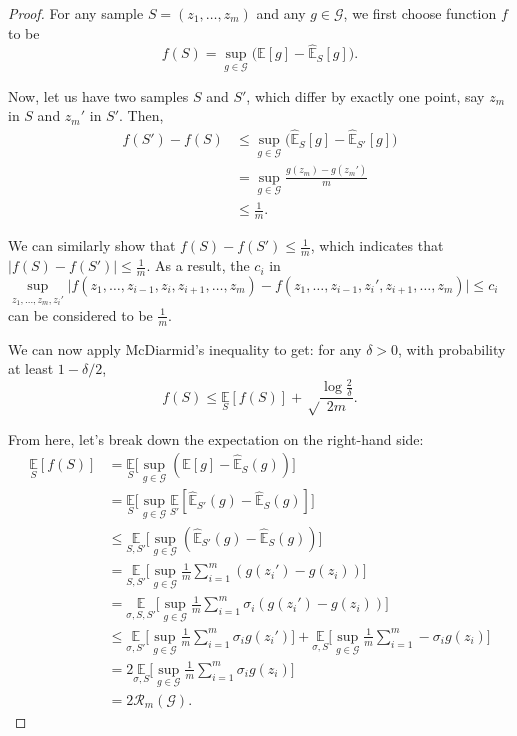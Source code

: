 \documentclass[twoside]{article}
\theoremstyle{definition}
\theoremstyle{definition}
\theoremstyle{remark}
\begin{document}
\begin{proof}

For any sample $S = (z_1,\ldots,z_m)$ and any $g\in\mathcal{G}$, we first choose function $f$ to be
\[
f(S) = \sup \limits_{g\in\mathcal{G}} \bigg( \mathbb{E}[g] - \hat{\mathbb{E}}_S[g] \bigg).
\]

Now, let us have two samples $S$ and $S'$, which differ by exactly one point, say $z_m$ in $S$ and $z_m'$ in $S'$. Then,
\[
\begin{aligned}
f(S') - f(S) &\leq \sup \limits_{g\in\mathcal{G}} \bigg( \hat{\mathbb{E}}_S[g] - \hat{\mathbb{E}}_{S'}[g] \bigg) \\
&= \sup \limits_{g\in\mathcal{G}} \frac{g(z_m) - g(z_m')}{m} \\
&\leq \frac{1}{m}.
\end{aligned}
\]

We can similarly show that $f(S) - f(S') \leq \frac{1}{m}$, which indicates that $| f(S) - f(S') | \leq \frac{1}{m}$. As a result, the $c_i$ in $\sup \limits_{z_1, \ldots, z_m, z_i'} \Bigg| f(z_1,\ldots,z_{i-1}, z_i, z_{i+1}, \ldots, z_m) - f(z_1, \ldots, z_{i-1}, z_i', z_{i+1}, \ldots, z_m)\Bigg| \leq c_i$ can be considered to be $\frac{1}{m}$.

We can now apply McDiarmid's inequality to get: for any $\delta > 0$, with probability at least $1 - \delta / 2$,
\[
f(S) \leq \underset{S}{\mathbb{E}} [f(S)] + \sqrt \frac{\log \frac{2}{\delta}}{2m}.
\]

From here, let's break down the expectation on the right-hand side:
\[
\begin{aligned}
\underset{S}{\mathbb{E}} [f(S)] &= \underset{S}{\mathbb{E}} \bigg[ \sup \limits_{g\in\mathcal{G}} ( \mathbb{E}[g] - \hat{\mathbb{E}}_S(g)) \bigg] \\
&= \underset{S}{\mathbb{E}} \bigg[ \sup \limits_{g\in\mathcal{G}} \underset{S'}{\mathbb{E}} [\hat{\mathbb{E}}_{S'}(g) - \hat{\mathbb{E}}_S(g)] \bigg] \\
&\leq \underset{S,S'}{\mathbb{E}} \bigg[ \sup \limits_{g\in\mathcal{G}} (\hat{\mathbb{E}}_{S'}(g) - \hat{\mathbb{E}}_S(g)) \bigg] \\
&= \underset{S,S'}{\mathbb{E}} \bigg[ \sup \limits_{g\in\mathcal{G}} \frac{1}{m} \sum \limits_{i=1}^m (g(z_i') - g(z_i)) \bigg] \\
&= \underset{\sigma,S,S'}{\mathbb{E}} \bigg[ \sup \limits_{g\in\mathcal{G}} \frac{1}{m} \sum \limits_{i=1}^m \sigma_i(g(z_i') - g(z_i)) \bigg] \\
&\leq \underset{\sigma,S'}{\mathbb{E}} \bigg[ \sup \limits_{g\in\mathcal{G}} \frac{1}{m} \sum \limits_{i=1}^m \sigma_i g(z_i') \bigg] + \underset{\sigma,S}{\mathbb{E}} \bigg[ \sup \limits_{g\in\mathcal{G}} \frac{1}{m} \sum \limits_{i=1}^m -\sigma_i g(z_i) \bigg] \\
&= 2 \underset{\sigma,S}{\mathbb{E}} \bigg[ \sup \limits_{g\in\mathcal{G}} \frac{1}{m} \sum \limits_{i=1}^m \sigma_i g(z_i) \bigg] \\
&= 2 \mathcal{R}_m(\mathcal{G}).
\end{aligned}
\]


\end{proof}
\end{document}
